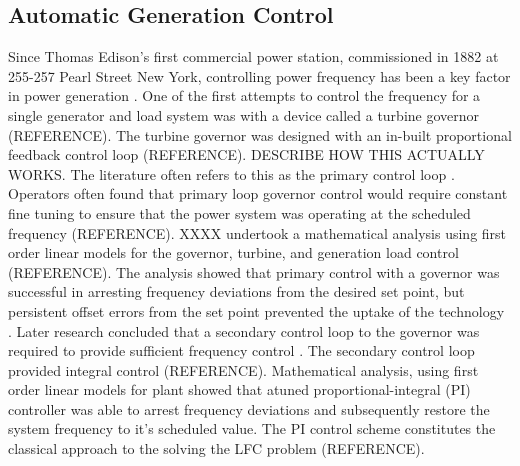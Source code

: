 \subsection{Automatic Generation Control}\label{agc}
Since Thomas Edison's first commercial power station, commissioned in 1882 at 255-257 Pearl Street New York, controlling power frequency has been a key factor in power generation \cite{Cohn1983}. One of the first attempts to control the frequency for a single generator and load system was with a device called a turbine governor (REFERENCE). The turbine governor was designed with an in-built proportional feedback control loop (REFERENCE). DESCRIBE HOW THIS ACTUALLY WORKS. The literature often refers to this as the primary control loop \cite{Bevrani2011}. Operators often found that primary loop governor control would require constant fine tuning to ensure that the power system was operating at the scheduled frequency (REFERENCE). XXXX undertook a mathematical analysis using first order linear models for the governor, turbine, and generation load control (REFERENCE). The analysis showed that primary control with a governor was successful in arresting frequency deviations from the desired set point, but persistent offset errors from the set point prevented the uptake of the technology \cite{Saadat}. Later research concluded that a secondary control loop to the governor was required to provide sufficient frequency control \cite{Elgerd1970}. The secondary control loop provided integral control (REFERENCE). Mathematical analysis, using first order linear models for plant showed that atuned proportional-integral (PI) controller was able to arrest frequency deviations and subsequently restore the system frequency to it's scheduled value. The PI control scheme constitutes the classical approach to the solving the LFC problem (REFERENCE).

